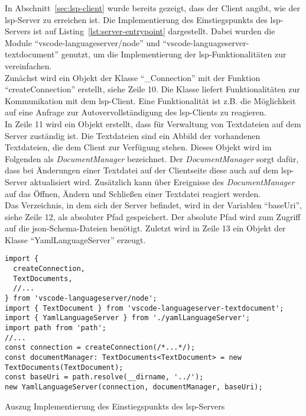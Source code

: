 In Abschnitt~\ref{sec:lsp-client} wurde bereits gezeigt, dass der Client angibt, wie der \ac{lsp}-Server zu erreichen ist.
Die Implementierung des Einstiegspunkts des \ac{lsp}-Servers ist auf Listing~\ref{lst:server-entrypoint} dargestellt.
Dabei wurden die Module ``vscode-languageserver/node'' und ``vscode-languageserver-textdocument'' genutzt, um die
Implementierung der \ac{lsp}-Funktionalitäten zur vereinfachen.
\\
Zunächst wird ein Objekt der Klasse ``\_Connection'' mit der Funktion ``createConnection'' erstellt, siehe Zeile 10.
Die Klasse liefert Funktionalitäten zur Kommunikation mit dem \ac{lsp}-Client.
Eine Funktionalität ist z.B. die Möglichkeit auf eine Anfrage zur Autovervollständigung des \ac{lsp}-Clients zu reagieren.
\\
In Zeile 11 wird ein Objekt erstellt, dass für Verwaltung von Textdateien auf dem Server zuständig ist.
Die Textdateien sind ein Abbild der vorhandenen Textdateien, die dem Client zur Verfügung stehen.
Dieses Objekt wird im Folgenden als \textit{DocumentManager} bezeichnet.
Der \textit{DocumentManager} sorgt dafür, dass bei Änderungen einer Textdatei auf der Clientseite diese auch auf dem \ac{lsp}-Server aktualisiert wird.
Zusätzlich kann über Ereignisse des \textit{DocumentManager} auf das Öffnen, Ändern und Schließen einer Textdatei reagiert werden.
\\
Das Verzeichnis, in dem sich der Server befindet, wird in der Variablen ``baseUri'', siehe Zeile 12, als absoluter Pfad gespeichert.
Der absolute Pfad wird zum Zugriff auf die \ac{json}-Schema-Dateien benötigt.
Zuletzt wird in Zeile 13 ein Objekt der Klasse ``YamlLanguageServer'' erzeugt.

\begin{listing}[htp]
  \begin{verbatim}
import { 
  createConnection, 
  TextDocuments, 
  //...
} from 'vscode-languageserver/node';
import { TextDocument } from 'vscode-languageserver-textdocument';
import { YamlLanguageServer } from './yamlLanguageServer';
import path from 'path';
//...
const connection = createConnection(/*...*/);
const documentManager: TextDocuments<TextDocument> = new TextDocuments(TextDocument);
const baseUri = path.resolve(__dirname, '../');
new YamlLanguageServer(connection, documentManager, baseUri);
      \end{verbatim}
  \caption{Auszug Implementierung des Einstiegspunkts des \acs{lsp}-Servers}
  \label{lst:server-entrypoint}
\end{listing}


